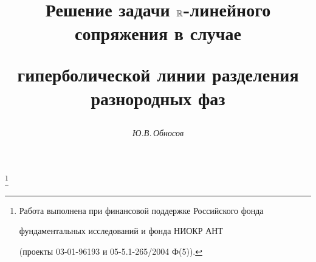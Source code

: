 








\renewcommand{\i}{\mathrm i\,}


\newcommand{\Div}{\operatorname{div}}


\newcommand{\Rot}{\operatorname{rot}}


\newcommand{\sign}{\operatorname{sign}}


\newcommand{\ch}{\operatorname{ch}}


\newcommand{\sh}{\operatorname{sh}}


\newcommand{\im}{\operatorname{Im}}


\newcommand{\re}{\operatorname{Re}}


\newcommand{\ra}{\rangle}


\newcommand{\tts}[1]{}










\setcounter{page}{53}















\author{\it Ю.В.\,Обносов}




\title{Решение задачи $\Bbb R$-линейного сопряжения в случае


гиперболической линии разделения разнородных фаз}


\thanks{Работа выполнена при финансовой поддержке Российского фонда


фундаментальных исследований и фонда НИОКР АНТ


(проекты 03-01-96193 и 05-5.1-265/2004 Ф(5)).}











